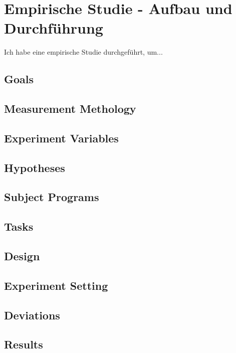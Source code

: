 \chapter{Empirische Studie - Aufbau und Durchführung}
Ich habe eine empirische Studie durchgeführt, um...
\section{Goals}
\section{Measurement Methology}
\section{Experiment Variables}
\section{Hypotheses}
\section{Subject Programs}
\section{Tasks}
\section{Design}
\section{Experiment Setting}
\section{Deviations}

\section{Results}
